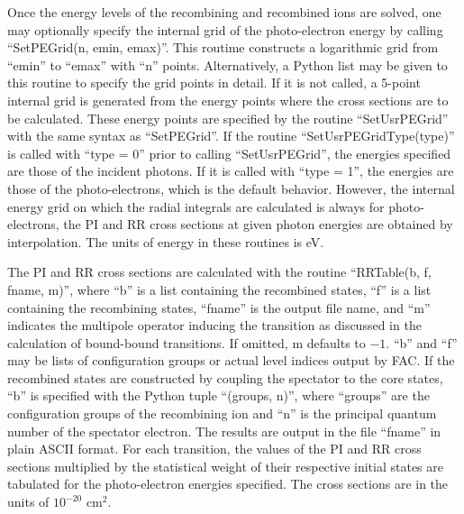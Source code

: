 \documentclass{elsart}
\begin{document}
Once the energy levels of the recombining and recombined ions are
solved, one may optionally specify the internal grid of the photo-electron
energy by calling ``SetPEGrid(n, emin, emax)''. This routime  constructs a
logarithmic 
grid from ``emin'' to ``emax'' with ``n'' points. Alternatively, a Python list
may be given to this routine to specify the grid points in detail. If it is
not called, a 5-point internal grid is generated from the energy points where
the cross sections are to be calculated. These energy points are specified by
the routine ``SetUsrPEGrid'' with the same syntax as ``SetPEGrid''. If the
routine ``SetUsrPEGridType(type)'' is called with
``type = 0'' prior to calling ``SetUsrPEGrid'', the energies specified are
those of the incident photons. If it is called with ``type = 1'', the energies
are those of the photo-electrons, which is the default behavior. However, the
internal energy grid on which the radial integrals are calculated is always
for photo-electrons, the PI and RR cross sections at given photon energies are
obtained by interpolation. The units of energy in these routines is eV.   

The PI and RR cross sections are calculated with the routine ``RRTable(b, f,
fname, m)'', where ``b'' is a list containing the recombined states, ``f'' is
a list containing the recombining
states, ``fname'' is the output file name, and ``m'' indicates the multipole
operator inducing the transition as discussed in the calculation of
bound-bound transitions. If omitted, m defaults to $-1$. ``b'' and ``f'' may be
lists of configuration groups or actual level indices output by FAC. If the
recombined states are constructed by coupling the spectator to the core
states, ``b'' is specified with the Python tuple ``(groups, n)'', where
``groups'' are the configuration groups of the recombining ion and ``n'' is
the principal quantum number of the spectator electron. The results are output
in the file ``fname'' in plain ASCII format. For each transition, the values of
the PI and RR cross sections multiplied by the statistical weight of their
respective initial states are tabulated for the photo-electron energies
specified. The cross sections are in the units of $10^{-20}$ cm$^2$. 
\end{document}
